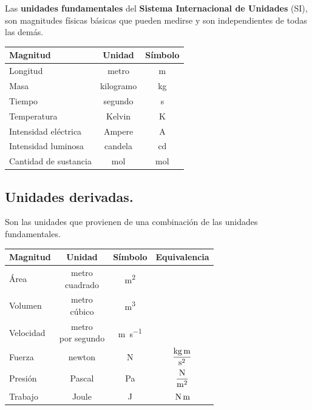 \documentclass[14pt]{extarticle}
\newcommand{\textocolor}[2]{\textbf{\textcolor{#1}{#2}}}
\begin{document}
Las \textocolor{airforceblue}{unidades fundamentales} del \textocolor{awesome}{Sistema Internacional de Unidades} (SI), son magnitudes físicas básicas que pueden medirse y son independientes de todas las demás.
\begin{table}[H]
\renewcommand{\arraystretch}{1.1}
\centering
\begin{tabular}{l | c | c}
Magnitud & Unidad & Símbolo \\ \hline 
Longitud & metro & \unit{m} \\ \hline 
Masa & kilogramo & \unit{\kilo\gram} \\ \hline
Tiempo & segundo & \unit{\second} \\ \hline
Temperatura & Kelvin & \unit{\kelvin} \\ \hline
Intensidad eléctrica & Ampere & \unit{\ampere} \\ \hline
Intensidad luminosa & candela & cd \\ \hline
Cantidad de sustancia & mol & \unit{mol}\\ \hline
\end{tabular}
\end{table}

\subsection{Unidades derivadas.}

Son las unidades que provienen de una combinación de las unidades fundamentales.
\begin{table}[H]
\renewcommand{\arraystretch}{1.1}
\centering
\begin{tabular}{l | c | c | c}
Magnitud & Unidad & Símbolo & Equivalencia\\ \hline 
Área & \makecell{metro \\ cuadrado} & \unit{\square\meter} &  \\ \hline
Volumen & \makecell{metro \\ cúbico} & \unit{\cubic\meter} &  \\ \hline
Velocidad & \makecell{metro \\ por segundo} & \unit{\meter\per\second} & \\ \hline
Fuerza & newton & \unit{\newton} & $\displaystyle \unit[per-mode=fraction]{\kilo\gram\meter\per\square\second} $\\ \hline 
Presión & Pascal & \unit{\pascal} & $\displaystyle \unit[per-mode=fraction]{\newton\per\square\meter}$ \\ \hline 
Trabajo & Joule & \unit{\joule} & $\displaystyle \unit[per-mode=fraction]{\newton\meter}$ \\ \hline
\end{tabular}
\end{table}
\end{document}
